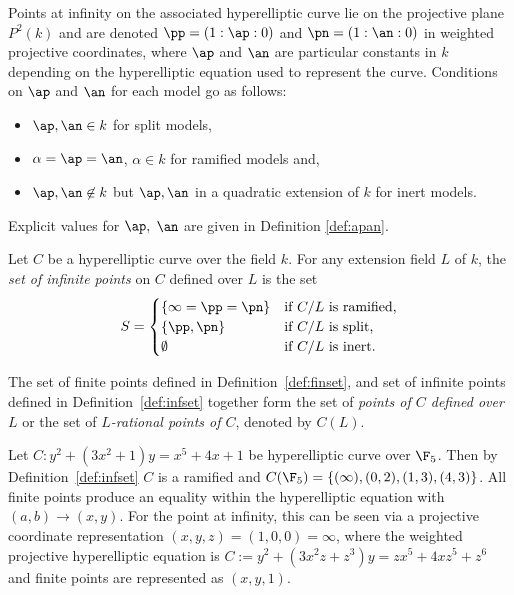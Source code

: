 \bd\label{def:infpoints}
\cite[Adapted from Definition~10.1.16]{Galbraith_PKC_2012}
Points at infinity on the associated hyperelliptic curve lie on the projective
plane $P^2(k)$ and are denoted $\pp = (1 : \ap : 0)$ and $\pn = (1 : \an : 0)$
in weighted projective coordinates, where $\ap$ and $\an$ are particular
constants in $k$ depending on  the hyperelliptic equation used to represent the
curve. Conditions on $\ap$ and $\an$ for each model go as follows:
\begin{itemize}
    \item $\ap,\an \in k$ for split models,
    \item $\alpha = \ap = \an$, $\alpha \in k$ for ramified models and,
    \item  $\ap,\an \not \in k$ but $\ap,\an$ in a quadratic extension of $k$ for inert models.
\end{itemize}
Explicit values for $\ap,$ $\an$ are given in Definition \ref{def:apan}.
\ed


\bd \label{def:infset}
\cite[Adapted from Definition~12.4.8]{HandbookFF_2013}  Let $C$ be a
hyperelliptic curve over the field $k$. For any extension field $L$ of $k$, the
\emph{set of infinite points} on $C$ defined over $L$ is the set
\begin{equation}
    S =
      \begin{cases}
        \{ \infty = \pp = \pn \} & \text{if $C/L$ is ramified,}\\
        \{ \pp, \pn \} & \text{if $C/L$ is split,}\\
        \emptyset & \text{if $C/L$ is inert.}
      \end{cases}       
  \end{equation}
\ed

\bd \label{def:setofpoints}
\cite[Adapted from Definition~12.4.8]{HandbookFF_2013}  The set of finite points
defined in Definition~\ref{def:finset}, and set of infinite points defined in
Definition~\ref{def:infset} together form the set of \emph{points of $C$ defined
over $L$} or the set of \emph{$L$-rational points of $C$}, denoted by $C(L)$.
\ed

\be\label{ex:ramified} Let $C : y^2 + (3x^2 + 1)y = x^5 + 4x + 1$ be
hyperelliptic curve over $\F_5$. Then by Definition~\ref{def:infset} $C$ is a
ramified and $C(\F_5) = \{(\infty), (0,2),(1,3),(4,3)\}$. All finite points
produce an equality within the hyperelliptic equation with $(a,b) \rightarrow (x,y)$.
For the point at infinity, this can be seen via a projective coordinate
representation $(x,y,z) = (1,0,0) = \infty$, where the weighted projective
hyperelliptic equation is $C := y^2 + (3x^2z + z^3)y = zx^5 + 4xz^5 + z^6$ and
finite points are represented as $(x,y,1)$.
\ee


